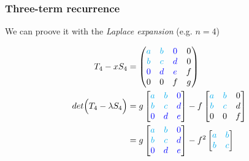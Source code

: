 \documentclass{beamer}
\theoremstyle{definition} \newtheorem{de}{Def}
\theoremstyle{remark} \newtheorem{os}[de]{Remark}
\theoremstyle{plain} \newtheorem{te}[de]{Teo}
\theoremstyle{plain} \newtheorem{co}[de]{Cor}
\theoremstyle{plain} \newtheorem{pr}[de]{Prop}
\theoremstyle{plain} \newtheorem{lem}[de]{Lemm}
\theoremstyle{remark} \newtheorem{rem}[de]{Remark}
\begin{document}
\begin{frame}
  \frametitle{Three-term recurrence}

  We can proove it with the \emph{Laplace expansion} (e.g. $n=4$)

  \begin{align*}
    T_4 - x S_4  &= \begin{pmatrix} 
      \textcolor{cyan}{a} & \textcolor{cyan}{b} & \textcolor{blue}{0} & 0\\
      \textcolor{cyan}{b} & \textcolor{cyan}{c} & \textcolor{blue}{d} & 0\\
      \textcolor{blue}{0} & \textcolor{blue}{d} & \textcolor{blue}{e} & f\\
      0 & 0 & f & g
    \end{pmatrix} \\
    det \Big( T_4 - \lambda S_4 \Big) &= g \begin{bmatrix}
      \textcolor{cyan}{a} & \textcolor{cyan}{b} & \textcolor{blue}{0}\\
      \textcolor{cyan}{b} & \textcolor{cyan}{c} & \textcolor{blue}{d}\\
      \textcolor{blue}{0} & \textcolor{blue}{d} & \textcolor{blue}{e}
    \end{bmatrix} -f \begin{bmatrix}
      \textcolor{cyan}{a} & \textcolor{cyan}{b} & 0\\
      \textcolor{cyan}{b} & \textcolor{cyan}{c} & d\\
      0 & 0 & f
    \end{bmatrix}\\
    &= g \begin{bmatrix} 
      \textcolor{cyan}{a} & \textcolor{cyan}{b} & \textcolor{blue}{0}\\
      \textcolor{cyan}{b} & \textcolor{cyan}{c} & \textcolor{blue}{d}\\
      \textcolor{blue}{0} & \textcolor{blue}{d} & \textcolor{blue}{e}
    \end{bmatrix} - f^2 \begin{bmatrix} 
      \textcolor{cyan}{a} & \textcolor{cyan}{b} \\ 
      \textcolor{cyan}{b} & \textcolor{cyan}{c} 
    \end{bmatrix}
  \end{align*}

\end{frame}
\end{document}
